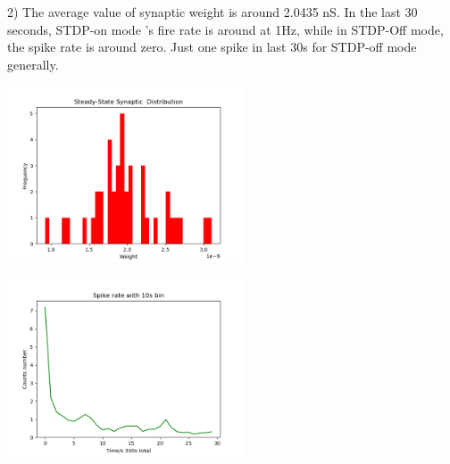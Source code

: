 \documentclass[fleqn,11pt]{article}
\begin{document}
\par 2) The average value of synaptic weight is around 2.0435 nS. In the last 30 seconds,
STDP-on mode 's fire rate is around at 1Hz, while in STDP-Off mode, the spike rate is around zero.
Just one spike in last 30s for STDP-off mode generally.
\begin{center}
  \begin{minipage}{\linewidth} 
  \begin{minipage}{0.45\linewidth}
    \includegraphics[width=7cm]{graphs/PartB_Question2_STDP_Average_g_6_times.png}
  \end{minipage}
  \hspace{0.05\linewidth}
  \begin{minipage}{0.45\linewidth}
    \includegraphics[width=7cm]{graphs/PartB_Question2_STDP_Average_Fire_Rate.png}
  \end{minipage}
\end{minipage} 
\end{center}

\newpage
\end{document}
